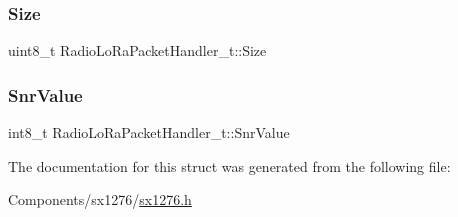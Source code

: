 \subsubsection{\texorpdfstring{Size}{Size}}
{\footnotesize\ttfamily uint8\+\_\+t Radio\+Lo\+Ra\+Packet\+Handler\+\_\+t\+::\+Size}

\mbox{\label{structRadioLoRaPacketHandler__t_a25f401925faaad4b55734743603f6c91}} 
\subsubsection{\texorpdfstring{Snr\+Value}{SnrValue}}
{\footnotesize\ttfamily int8\+\_\+t Radio\+Lo\+Ra\+Packet\+Handler\+\_\+t\+::\+Snr\+Value}



The documentation for this struct was generated from the following file\+:\begin{DoxyCompactItemize}
\item 
Components/sx1276/\hyperlink{sx1276_8h}{sx1276.\+h}\end{DoxyCompactItemize}
